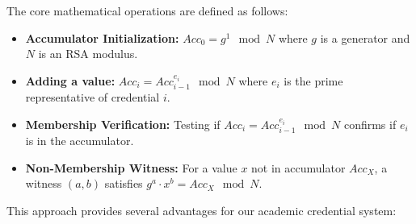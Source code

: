 \documentclass[lettersize,journal]{IEEEtran}
\begin{document}
The core mathematical operations are defined as follows:

\begin{itemize}
    \item \textbf{Accumulator Initialization:} $Acc_0 = g^{1} \mod N$ where $g$ is a generator and $N$ is an RSA modulus.
    
    \item \textbf{Adding a value:} $Acc_i = Acc_{i-1}^{e_i} \mod N$ where $e_i$ is the prime representative of credential $i$.
    
    \item \textbf{Membership Verification:} Testing if $Acc_i = Acc_{i-1}^{e_i} \mod N$ confirms if $e_i$ is in the accumulator.
    
    \item \textbf{Non-Membership Witness:} For a value $x$ not in accumulator $Acc_X$, a witness $(a, b)$ satisfies $g^a \cdot x^b = Acc_X \mod N$.
\end{itemize}

This approach provides several advantages for our academic credential system:
\end{document}
